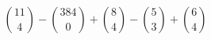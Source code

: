 \documentclass[letterpaper,12pt]{article}
\begin{document}
\[
\binom{11}{4} - \binom{384}{0} + \binom{8}{4} - \binom{5}{3} + \binom{6}{4}
\]
\end{document}
